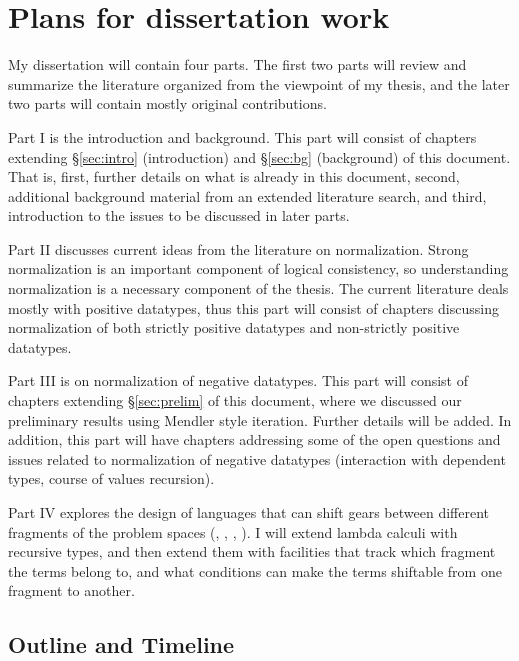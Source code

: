 \section{Plans for dissertation work}\label{sec:plan}

My dissertation will contain four parts.
The first two parts will review and summarize the literature
organized from the viewpoint of my thesis, and the later two parts will
contain mostly original contributions.

Part I is the introduction and background. This part will consist of chapters
extending \S\ref{sec:intro} (introduction) and \S\ref{sec:bg} (background)
of this document. That is, first, further details on what is already in this document,
second, additional background material from an extended literature search, and third, introduction to the issues to be
discussed in later parts.

Part II discusses current ideas from the literature on normalization.
Strong  normalization is an important component of logical consistency, so
understanding normalization is a necessary component of the thesis.
The current literature deals mostly with positive datatypes,
thus this part will consist of chapters discussing normalization of
both strictly positive datatypes and non-strictly positive datatypes. 

Part III is on normalization of negative datatypes. This part will consist of
chapters extending \S\ref{sec:prelim} of this document, where we discussed our
preliminary results using Mendler style iteration. Further details will be added.
In addition, this part will have chapters addressing some of the open questions and
issues related to normalization of negative datatypes
(\eg interaction with dependent types, course of values recursion).

Part IV explores the design of languages that can shift gears between
different fragments of the problem spaces (\IND, \INDbot, \REC, \RECbot).
I will extend lambda calculi with recursive types, and then extend them with
facilities that track which fragment the terms belong to, and what conditions
can make the terms shiftable from one fragment to another.

\subsection{Outline and Timeline}

